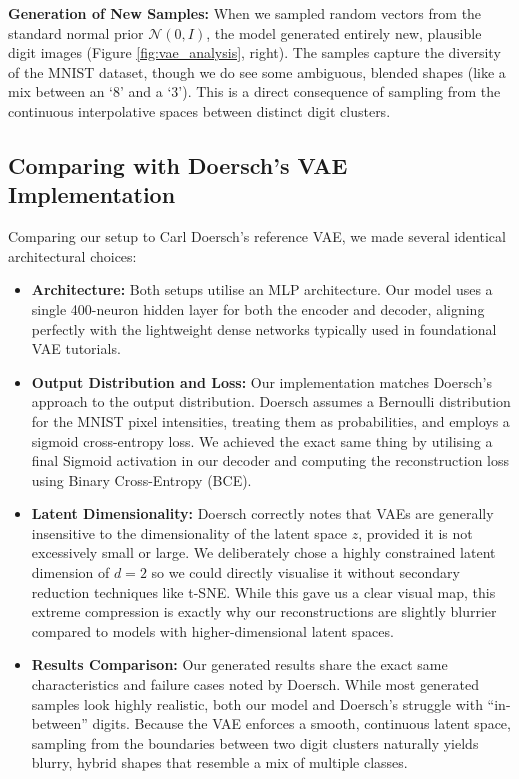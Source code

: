 \documentclass{article}
\begin{document}
    \textbf{Generation of New Samples:} When we sampled random vectors from the standard normal prior $\mathcal{N}(0, I)$, the model generated entirely new, plausible digit images (Figure \ref{fig:vae_analysis}, right). The samples capture the diversity of the MNIST dataset, though we do see some ambiguous, blended shapes (like a mix between an `8' and a `3'). This is a direct consequence of sampling from the continuous interpolative spaces between distinct digit clusters.
    
    \subsection{Comparing with Doersch's VAE Implementation}
    Comparing our setup to Carl Doersch's reference VAE, we made several identical architectural choices:
    
    \begin{itemize}
        \item \textbf{Architecture:} Both setups utilise an MLP architecture. Our model uses a single 400-neuron hidden layer for both the encoder and decoder, aligning perfectly with the lightweight dense networks typically used in foundational VAE tutorials.
        \item \textbf{Output Distribution and Loss:} Our implementation matches Doersch's approach to the output distribution. Doersch assumes a Bernoulli distribution for the MNIST pixel intensities, treating them as probabilities, and employs a sigmoid cross-entropy loss. We achieved the exact same thing by utilising a final Sigmoid activation in our decoder and computing the reconstruction loss using Binary Cross-Entropy (BCE).
        \item \textbf{Latent Dimensionality:} Doersch correctly notes that VAEs are generally insensitive to the dimensionality of the latent space $z$, provided it is not excessively small or large. We deliberately chose a highly constrained latent dimension of $d = 2$ so we could directly visualise it without secondary reduction techniques like t-SNE. While this gave us a clear visual map, this extreme compression is exactly why our reconstructions are slightly blurrier compared to models with higher-dimensional latent spaces.
        \item \textbf{Results Comparison:} Our generated results share the exact same characteristics and failure cases noted by Doersch. While most generated samples look highly realistic, both our model and Doersch's struggle with ``in-between'' digits. Because the VAE enforces a smooth, continuous latent space, sampling from the boundaries between two digit clusters naturally yields blurry, hybrid shapes that resemble a mix of multiple classes.
    \end{itemize}
    
\end{document}
